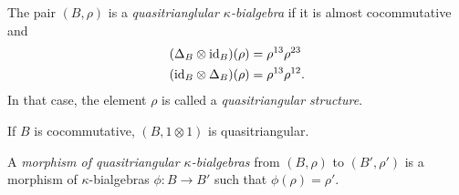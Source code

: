 \begin{defn}
    The pair $(B,\rho)$ is a \textsl{quasitrianglular $\kappa$-bialgebra} if it is almost cocommutative and
    \begin{align*}
        (\Delta_B\otimes\text{\rm id}_B)(\rho) &= \rho^{13}\rho^{23}\\
        (\text{\rm id}_B\otimes\Delta_B)(\rho) &= \rho^{13}\rho^{12}.
    \end{align*}
    In that case, the element $\rho$ is called a \textsl{quasitriangular structure}.
\end{defn}

\begin{rem}
    If $B$ is cocommutative, $(B,1\otimes1)$ is quasitriangular.
\end{rem}

\begin{defn}
    A \textsl{morphism of quasitriangular $\kappa$-bialgebras} from $(B,\rho)$ to $(B',\rho')$ is a morphism of $\kappa$-bialgebras $\phi\colon B\to B'$ such that $\phi(\rho)=\rho'$.
\end{defn}

